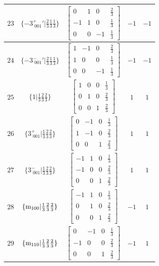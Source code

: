 \documentclass[fleqn,8pt]{jsarticle}
\begin{document}
\begin{longtable}{ccccc}
$ 23 $ & $ \{-3^{+}_{\,\,001}{}'|\frac{2}{3} \frac{1}{3} \frac{1}{3}\} $ & $ \begin{bmatrix} 0 & 1 & 0 & \frac{2}{3} \\ -1 & 1 & 0 & \frac{1}{3} \\ 0 & 0 & -1 & \frac{1}{3} \end{bmatrix} $ & $ -1 $ & $ -1 $ \\ \hline
$ 24 $ & $ \{-3^{-}_{\,\,001}{}'|\frac{2}{3} \frac{1}{3} \frac{1}{3}\} $ & $ \begin{bmatrix} 1 & -1 & 0 & \frac{2}{3} \\ 1 & 0 & 0 & \frac{1}{3} \\ 0 & 0 & -1 & \frac{1}{3} \end{bmatrix} $ & $ -1 $ & $ -1 $ \\ \hline
$ 25 $ & $ \{1|\frac{1}{3} \frac{2}{3} \frac{2}{3}\} $ & $ \begin{bmatrix} 1 & 0 & 0 & \frac{1}{3} \\ 0 & 1 & 0 & \frac{2}{3} \\ 0 & 0 & 1 & \frac{2}{3} \end{bmatrix} $ & $ 1 $ & $ 1 $ \\ \hline
$ 26 $ & $ \{3^{+}_{\,\,001}|\frac{1}{3} \frac{2}{3} \frac{2}{3}\} $ & $ \begin{bmatrix} 0 & -1 & 0 & \frac{1}{3} \\ 1 & -1 & 0 & \frac{2}{3} \\ 0 & 0 & 1 & \frac{2}{3} \end{bmatrix} $ & $ 1 $ & $ 1 $ \\ \hline
$ 27 $ & $ \{3^{-}_{\,\,001}|\frac{1}{3} \frac{2}{3} \frac{2}{3}\} $ & $ \begin{bmatrix} -1 & 1 & 0 & \frac{1}{3} \\ -1 & 0 & 0 & \frac{2}{3} \\ 0 & 0 & 1 & \frac{2}{3} \end{bmatrix} $ & $ 1 $ & $ 1 $ \\ \hline
$ 28 $ & $ \{{\rm m}_{100}|\frac{1}{3} \frac{2}{3} \frac{2}{3}\} $ & $ \begin{bmatrix} -1 & 1 & 0 & \frac{1}{3} \\ 0 & 1 & 0 & \frac{2}{3} \\ 0 & 0 & 1 & \frac{2}{3} \end{bmatrix} $ & $ -1 $ & $ 1 $ \\ \hline
$ 29 $ & $ \{{\rm m}_{110}|\frac{1}{3} \frac{2}{3} \frac{2}{3}\} $ & $ \begin{bmatrix} 0 & -1 & 0 & \frac{1}{3} \\ -1 & 0 & 0 & \frac{2}{3} \\ 0 & 0 & 1 & \frac{2}{3} \end{bmatrix} $ & $ -1 $ & $ 1 $ \\ \hline

\end{longtable}
\end{document}

